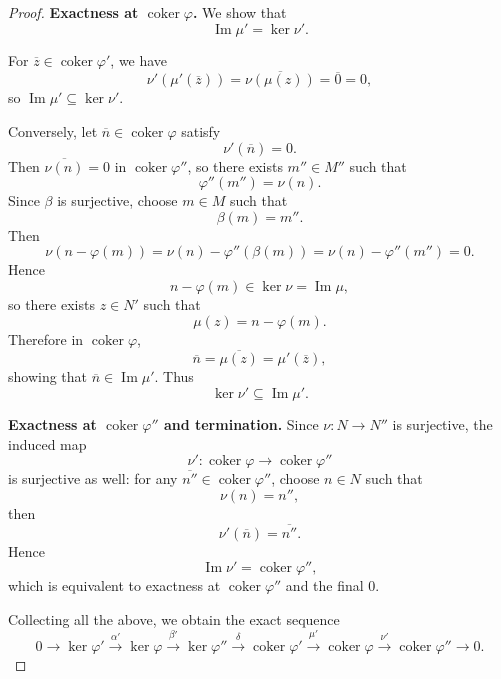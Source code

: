 \begin{proof}
    \medskip

    \noindent\textbf{Exactness at $\operatorname{coker}\varphi$.}
    We show that
    \[
        \operatorname{Im}\mu'=\ker\nu'.
    \]

    For $\overline{z}\in \operatorname{coker}\varphi'$, we have
    \[
        \nu'(\mu'(\overline{z}))=\overline{\nu(\mu(z))}=\overline{0}=0,
    \]
    so $\operatorname{Im}\mu'\subseteq \ker\nu'$.

    Conversely, let $\overline{n}\in \operatorname{coker}\varphi$ satisfy
    \[
        \nu'(\overline{n})=0.
    \]
    Then $\overline{\nu(n)}=0$ in $\operatorname{coker}\varphi''$, so there exists $m''\in M''$ such that
    \[
        \varphi''(m'')=\nu(n).
    \]
    Since $\beta$ is surjective, choose $m\in M$ such that
    \[
        \beta(m)=m''.
    \]
    Then
    \[
        \nu(n-\varphi(m))=\nu(n)-\varphi''(\beta(m))=\nu(n)-\varphi''(m'')=0.
    \]
    Hence
    \[
        n-\varphi(m)\in \ker\nu=\operatorname{Im}\mu,
    \]
    so there exists $z\in N'$ such that
    \[
        \mu(z)=n-\varphi(m).
    \]
    Therefore in $\operatorname{coker}\varphi$,
    \[
        \overline{n}=\overline{\mu(z)}=\mu'(\overline{z}),
    \]
    showing that $\overline{n}\in \operatorname{Im}\mu'$. Thus
    \[
        \ker\nu'\subseteq \operatorname{Im}\mu'.
    \]

    \medskip

    \noindent\textbf{Exactness at $\operatorname{coker}\varphi''$ and termination.}
    Since $\nu:N\to N''$ is surjective, the induced map
    \[
        \nu':\operatorname{coker}\varphi\to \operatorname{coker}\varphi''
    \]
    is surjective as well: for any $\overline{n''}\in \operatorname{coker}\varphi''$, choose $n\in N$ such that
    \[
        \nu(n)=n'',
    \]
    then
    \[
        \nu'(\overline{n})=\overline{n''}.
    \]
    Hence
    \[
        \operatorname{Im}\nu'=\operatorname{coker}\varphi'',
    \]
    which is equivalent to exactness at $\operatorname{coker}\varphi''$ and the final $0$.

    Collecting all the above, we obtain the exact sequence
    \[
        0 \longrightarrow \ker\varphi'
        \overset{\alpha'}{\longrightarrow} \ker\varphi
        \overset{\beta'}{\longrightarrow} \ker\varphi''
        \overset{\delta}{\longrightarrow} \operatorname{coker}\varphi'
        \overset{\mu'}{\longrightarrow} \operatorname{coker}\varphi
        \overset{\nu'}{\longrightarrow} \operatorname{coker}\varphi''
        \longrightarrow 0.
    \]
\end{proof}

